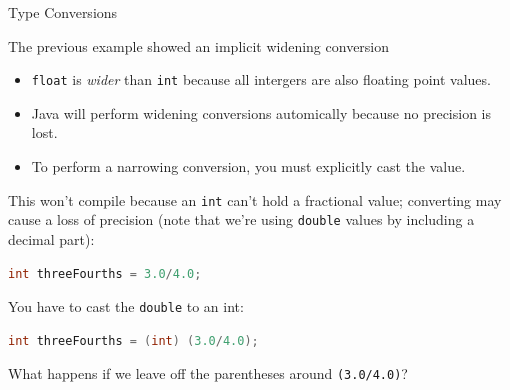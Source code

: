 \documentclass{beamer}
\begin{document}
\begin{frame}[fragile]{Type Conversions}


The previous example showed an implicit widening conversion
\begin{itemize}
\item {\tt float} is {\it wider} than {\tt int} because all intergers are also floating point values.
\item Java will perform widening conversions automically because no precision is lost.
\item To perform a narrowing conversion, you must explicitly cast the value.
\end{itemize}

This won't compile because an {\tt int} can't hold a fractional value; converting may cause a loss of precision (note that we're using {\tt double} values by including a decimal part):
\begin{lstlisting}[language=Java]
int threeFourths = 3.0/4.0;
\end{lstlisting}

You have to cast the {\tt double} to an int:

\begin{lstlisting}[language=Java]
int threeFourths = (int) (3.0/4.0);
\end{lstlisting}

What happens if we leave off the parentheses around {\tt (3.0/4.0)}?


\end{frame}
\end{document}
